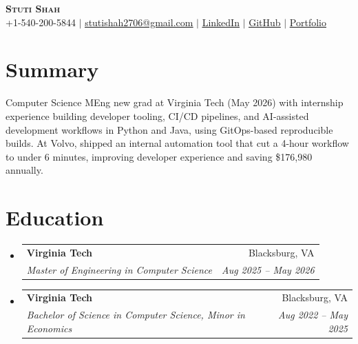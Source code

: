 \documentclass[letterpaper,11pt]{article}
\makeatletter
\newcommand{\resumeSubheading}[4]{
  \vspace{-2pt}\item
    \begin{tabular*}{0.97\textwidth}[t]{l@{\extracolsep{\fill}}r}
      \textbf{#1} & #2 \\
      \textit{\small#3} & \textit{\small #4} \\
    \end{tabular*}\vspace{-7pt}
}
\newcommand{\resumeSubHeadingListStart}{\begin{itemize}[leftmargin=0.15in, label={}]}
\newcommand{\resumeSubHeadingListEnd}{\end{itemize}}
\makeatother
\begin{document}
\begin{center}
    \textbf{\Huge \scshape Stuti Shah} \\ \vspace{1pt}
    \small +1-540-200-5844 $|$ \href{mailto:stutishah2706@gmail.com}{\underline{stutishah2706@gmail.com}} $|$ \href{https://linkedin.com/in/stutishah9}{\underline{LinkedIn}} $|$ \href{https://github.com/stutshah9}{\underline{GitHub}} $|$ \href{https://stutshah9.github.io/}{\underline{Portfolio}}
\end{center}

\section{Summary}
 \small{Computer Science MEng new grad at Virginia Tech (May 2026) with internship experience building developer tooling, CI/CD pipelines, and AI-assisted development workflows in Python and Java, using GitOps-based reproducible builds. At Volvo, shipped an internal automation tool that cut a 4-hour workflow to under 6 minutes, improving developer experience and saving \$176,980 annually.}
 \vspace{2pt}

\section{Education}
  \resumeSubHeadingListStart
    \resumeSubheading
      {Virginia Tech}{Blacksburg, VA}
      {Master of Engineering in Computer Science}{Aug 2025 -- May 2026}
    \resumeSubheading
      {Virginia Tech}{Blacksburg, VA}
      {Bachelor of Science in Computer Science, Minor in Economics}{Aug 2022 -- May 2025}
  \resumeSubHeadingListEnd
\end{document}
